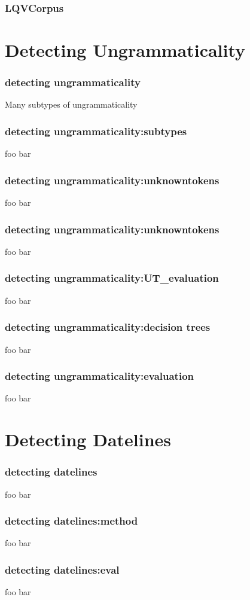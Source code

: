 \documentclass[table]{beamer}
\begin{document}
\begin{frame}
  \frametitle{LQVCorpus}

\end{frame}

\section{Detecting Ungrammaticality}
\begin{frame}
  \frametitle{detecting ungrammaticality}
  Many subtypes of ungrammaticality
\end{frame}

\begin{frame}
  \frametitle{detecting ungrammaticality:subtypes}
  foo bar
\end{frame}

\begin{frame}
  \frametitle{detecting ungrammaticality:unknowntokens}
  foo bar
\end{frame}

\begin{frame}
  \frametitle{detecting ungrammaticality:unknowntokens}
  foo bar
\end{frame}

\begin{frame}
  \frametitle{detecting ungrammaticality:UT\_evaluation}
  foo bar
\end{frame}

\begin{frame}
  \frametitle{detecting ungrammaticality:decision trees}
  foo bar
\end{frame}

\begin{frame}
  \frametitle{detecting ungrammaticality:evaluation}
  foo bar
\end{frame}

\section{Detecting Datelines}
\begin{frame}
  \frametitle{detecting datelines}
  foo bar
\end{frame}

\begin{frame}
  \frametitle{detecting datelines:method}
  foo bar
\end{frame}

\begin{frame}
  \frametitle{detecting datelines:eval}
  foo bar
\end{frame}
\end{document}
